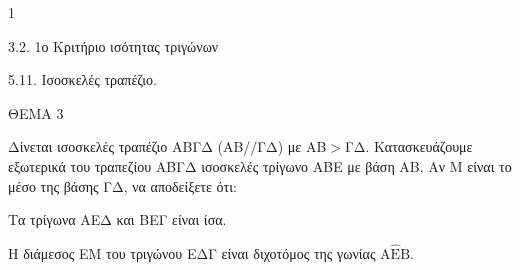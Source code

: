 \begin{ylh}{1}
    \item 3.2. 1ο Κριτήριο ισότητας τριγώνων
    \item 5.11. Ισοσκελές τραπέζιο.
\end{ylh}

ΘΕΜΑ 3

Δίνεται ισοσκελές τραπέζιο ΑΒΓΔ (ΑΒ//ΓΔ) με ΑΒ$>$ΓΔ. Κατασκευάζουμε εξωτερικά του τραπεζίου ΑΒΓΔ ισοσκελές τρίγωνο ΑΒΕ με βάση ΑΒ. Αν Μ είναι το μέσο της βάσης ΓΔ, να αποδείξετε ότι:

\begin{alist}
\item Τα τρίγωνα ΑΕΔ και ΒΕΓ είναι ίσα.


\item Η διάμεσος ΕΜ του τριγώνου ΕΔΓ είναι διχοτόμος της γωνίας $\text{A}\widehat{\text{E}}\text{B}$.

\end{alist}

